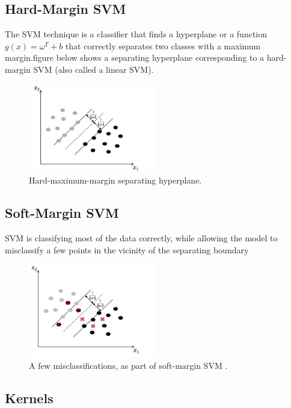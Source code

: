 \subsection{Hard-Margin SVM}
The SVM technique is a classifier that finds a hyperplane or a function $g(x) = {\omega}^T +  b$   that correctly separates two classes with a maximum margin.figure below shows a separating hyperplane corresponding to a hard-margin SVM (also called a linear SVM).

\begin{figure}[H]
\centering
\includegraphics[width=0.5\textwidth]{img/hardmargin.PNG}
\caption{ Hard-maximum-margin separating hyperplane. }
\label{125 }
\end{figure}


\subsection{Soft-Margin SVM}
SVM is classifying most of the data correctly, while allowing the model to misclassify a few points in the vicinity of the separating boundary

\begin{figure}[H]
\centering
\includegraphics[width=0.5\textwidth]{img/softmargin.PNG}
\caption{  A few misclassifications, as part of soft-margin SVM . }
\label{126 }
\end{figure}


\subsection{Kernels}

